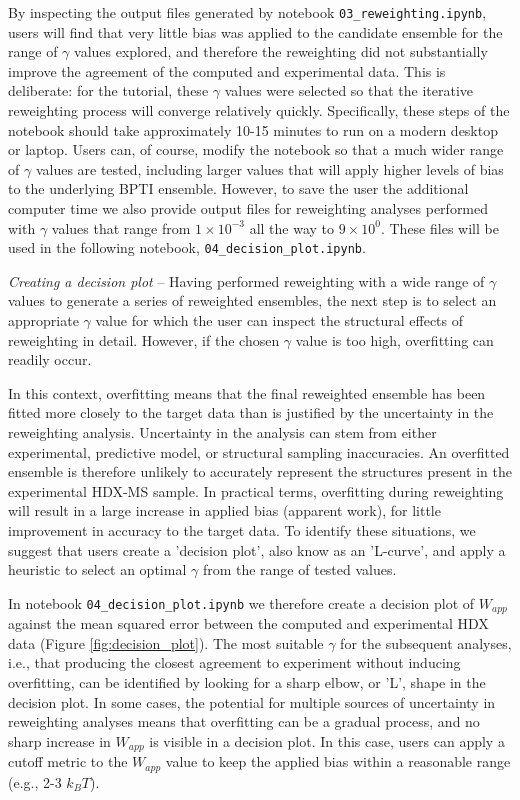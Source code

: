 \documentclass[9pt,tutorial,ASAPversion]{livecoms}
\begin{document}
By inspecting the output files generated by notebook \texttt{03\_reweighting.ipynb}, users will find that very little bias was applied to the candidate ensemble for the range of $\gamma$ values explored, and therefore the reweighting did not substantially improve the agreement of the computed and experimental data.
This is deliberate: for the tutorial, these $\gamma$ values were selected so that the iterative reweighting process will converge relatively quickly. 
Specifically, these steps of the notebook should take approximately 10-15 minutes to run on a modern desktop or laptop.
Users can, of course, modify the notebook so that a much wider range of $\gamma$ values are tested, including larger values that will apply higher levels of bias to the underlying BPTI ensemble.
However, to save the user the additional computer time we also provide output files for reweighting analyses performed with $\gamma$ values that range from $1\times10^{-3}$ all the way to $9\times10^{0}$. 
These files will be used in the following notebook, \texttt{04\_decision\_plot.ipynb}.

\noindent 
\textit{Creating a decision plot} -- Having performed reweighting with a wide range of $\gamma$ values to generate a series of reweighted ensembles, the next step is to select an appropriate $\gamma$ value for which the user can inspect the structural effects of reweighting in detail. 
However, if the chosen $\gamma$ value is too high, overfitting can readily occur. 

In this context, overfitting means that the final reweighted ensemble has been fitted more closely to the target data than is justified by the uncertainty in the reweighting analysis. 
Uncertainty in the analysis can stem from either experimental, predictive model, or structural sampling inaccuracies. 
An overfitted ensemble is therefore unlikely to accurately represent the structures present in the experimental HDX-MS sample. 
In practical terms, overfitting during reweighting will result in a large increase in applied bias (apparent work), for little improvement in accuracy to the target data. 
To identify these situations, we suggest that users create a 'decision plot', also know as an 'L-curve', and apply a heuristic to select an optimal $\gamma$ from the range of tested values.  

In notebook \texttt{04\_decision\_plot.ipynb} we therefore create a decision plot of $W_{app}$ against the mean squared error between the computed and experimental HDX data (Figure \ref{fig:decision_plot}).
The most suitable $\gamma$ for the subsequent analyses, i.e., that producing the closest agreement to experiment without inducing overfitting, can be identified by looking for a sharp elbow, or 'L', shape in the decision plot.
In some cases, the potential for multiple sources of uncertainty in reweighting analyses means that overfitting can be a gradual process, and no sharp increase in $W_{app}$ is visible in a decision plot.
In this case, users can apply a cutoff metric to the $W_{app}$ value to keep the applied bias within a reasonable range (e.g., 2-3 $k_BT$). 
\end{document}
